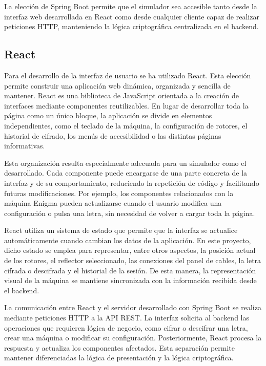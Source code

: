 La elección de Spring Boot permite que el simulador sea accesible tanto desde la interfaz web desarrollada en React como desde cualquier cliente capaz de realizar peticiones HTTP, manteniendo la lógica criptográfica centralizada en el backend.

\subsection{React}

Para el desarrollo de la interfaz de usuario se ha utilizado React. Esta elección permite construir una aplicación web dinámica, organizada y sencilla de mantener. React es una biblioteca de JavaScript orientada a la creación de interfaces mediante componentes reutilizables. En lugar de desarrollar toda la página como un único bloque, la aplicación se divide en elementos independientes, como el teclado de la máquina, la configuración de rotores, el historial de cifrado, los menús de accesibilidad o las distintas páginas informativas.

Esta organización resulta especialmente adecuada para un simulador como el desarrollado. Cada componente puede encargarse de una parte concreta de la interfaz y de su comportamiento, reduciendo la repetición de código y facilitando futuras modificaciones. Por ejemplo, los componentes relacionados con la máquina Enigma pueden actualizarse cuando el usuario modifica una configuración o pulsa una letra, sin necesidad de volver a cargar toda la página.

React utiliza un sistema de estado que permite que la interfaz se actualice automáticamente cuando cambian los datos de la aplicación. En este proyecto, dicho estado se emplea para representar, entre otros aspectos, la posición actual de los rotores, el reflector seleccionado, las conexiones del panel de cables, la letra cifrada o descifrada y el historial de la sesión. De esta manera, la representación visual de la máquina se mantiene sincronizada con la información recibida desde el backend.

La comunicación entre React y el servidor desarrollado con Spring Boot se realiza mediante peticiones HTTP a la API REST. La interfaz solicita al backend las operaciones que requieren lógica de negocio, como cifrar o descifrar una letra, crear una máquina o modificar su configuración. Posteriormente, React procesa la respuesta y actualiza los componentes afectados. Esta separación permite mantener diferenciadas la lógica de presentación y la lógica criptográfica.

